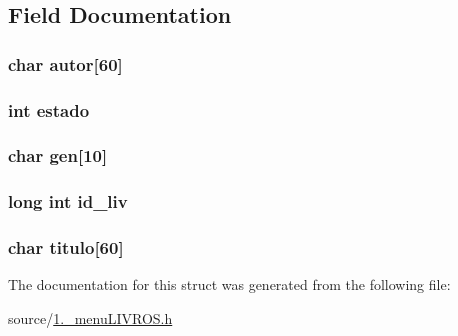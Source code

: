 \subsection{Field Documentation}
\hypertarget{structlivro_add9eee69a1a2bf18ad97aa2d57961845}{
\subsubsection[{autor}]{\setlength{\rightskip}{0pt plus 5cm}char autor\mbox{[}60\mbox{]}}}\label{structlivro_add9eee69a1a2bf18ad97aa2d57961845}
\hypertarget{structlivro_a876d08c1d21086e4fd228744da10d028}{
\subsubsection[{estado}]{\setlength{\rightskip}{0pt plus 5cm}int estado}}\label{structlivro_a876d08c1d21086e4fd228744da10d028}
\hypertarget{structlivro_a81b3cc6450c77481974037c3222cb9ff}{
\subsubsection[{gen}]{\setlength{\rightskip}{0pt plus 5cm}char gen\mbox{[}10\mbox{]}}}\label{structlivro_a81b3cc6450c77481974037c3222cb9ff}
\hypertarget{structlivro_a06dd325b1ebe2325328d3d76fae3823a}{
\subsubsection[{id\+\_\+liv}]{\setlength{\rightskip}{0pt plus 5cm}long int id\+\_\+liv}}\label{structlivro_a06dd325b1ebe2325328d3d76fae3823a}
\hypertarget{structlivro_adff70562cca95767369bccf3714e22e9}{
\subsubsection[{titulo}]{\setlength{\rightskip}{0pt plus 5cm}char titulo\mbox{[}60\mbox{]}}}\label{structlivro_adff70562cca95767369bccf3714e22e9}


The documentation for this struct was generated from the following file\+:\begin{DoxyCompactItemize}
\item 
source/\hyperlink{1_82__menu_l_i_v_r_o_s_8h}{1.\+\_\+menu\+L\+I\+V\+R\+O\+S.\+h}\end{DoxyCompactItemize}
